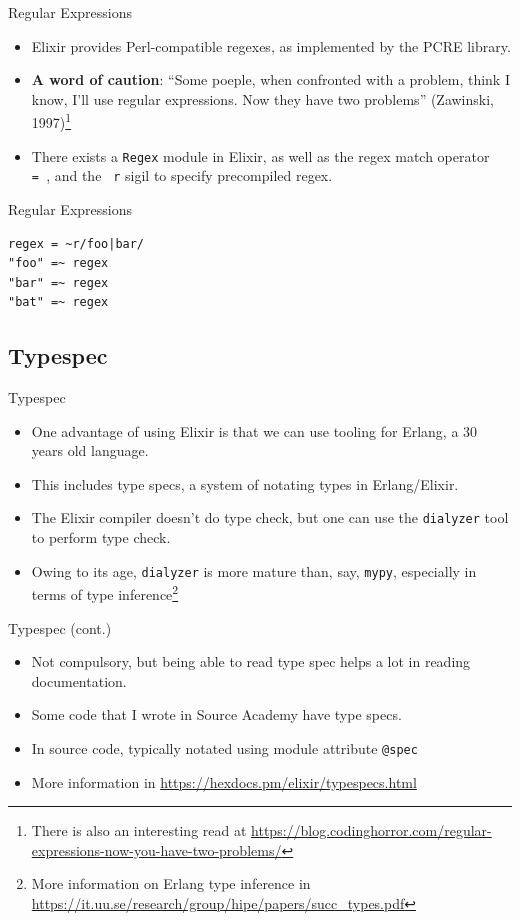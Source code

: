 \documentclass[12pt]{beamer}
\begin{document}
\begin{frame}[fragile]{Regular Expressions}
  \begin{itemize}
    \item Elixir provides Perl-compatible regexes, as implemented by the PCRE library.
    \item \textbf{A word of caution}: ``Some poeple, when confronted with a problem, think I know, I'll use regular expressions. Now they have two problems'' (Zawinski, 1997)\footnote{There is also an interesting read at \url{https://blog.codinghorror.com/regular-expressions-now-you-have-two-problems/}}
    \item There exists a \texttt{Regex} module in Elixir, as well as the regex match operator \texttt{=~}, and the \texttt{~r} sigil to specify precompiled regex.
  \end{itemize}
\end{frame}

\begin{frame}[fragile]{Regular Expressions}
  \begin{verbatim}
regex = ~r/foo|bar/
"foo" =~ regex
"bar" =~ regex
"bat" =~ regex
  \end{verbatim}
\end{frame}

\subsection{Typespec}
\begin{frame}{Typespec}
  \begin{itemize}
    \item One advantage of using Elixir is that we can use tooling for Erlang, a 30 years old language.
    \item This includes type specs, a system of notating types in Erlang/Elixir.
    \item The Elixir compiler doesn't do type check, but one can use the \texttt{dialyzer} tool to perform type check.
    \item Owing to its age, \texttt{dialyzer} is more mature than, say, \texttt{mypy}, especially in terms of type inference\footnote{More information on Erlang type inference in \url{https://it.uu.se/research/group/hipe/papers/succ_types.pdf}}
  \end{itemize}
\end{frame}

\begin{frame}{Typespec (cont.)}
  \begin{itemize}
    \item Not compulsory, but being able to read type spec helps a lot in reading documentation.
    \item Some code that I wrote in Source Academy have type specs.
    \item In source code, typically notated using module attribute \texttt{@spec}
    \item More information in \url{https://hexdocs.pm/elixir/typespecs.html}
  \end{itemize}
\end{frame}
\end{document}
